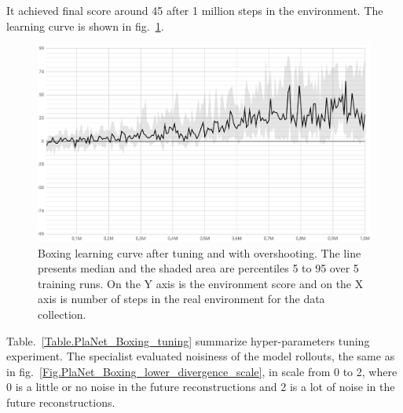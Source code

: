 It achieved final score around 45 after 1 million steps in the environment. The learning curve is shown in fig.~\ref{Fig.Boxing_with_overshooting}.

\begin{figure}[H]
\includegraphics[width=1\textwidth,keepaspectratio]{figures/PlaNet/Boxing_with_overshooting.png}
\caption[Boxing learning curve after tuning and with overshooting]{Boxing learning curve after tuning and with overshooting. The line presents median and the shaded area are percentiles 5 to 95 over 5 training runs. On the Y axis is the environment score and on the X axis is number of steps in the real environment for the data collection.}
\label{Fig.Boxing_with_overshooting}
\end{figure}

Table.~\ref{Table.PlaNet_Boxing_tuning} summarize hyper-parameters tuning experiment. The specialist evaluated noisiness of the model rollouts, the same as in fig.~\ref{Fig.PlaNet_Boxing_lower_divergence_scale}, in scale from 0 to 2, where 0 is a little or no noise in the future reconstructions and 2 is a lot of noise in the future reconstructions.

